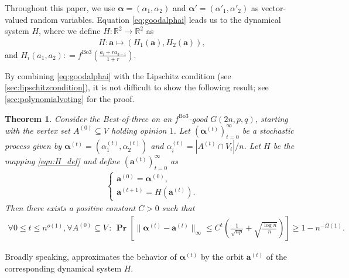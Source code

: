 \documentclass[letterpaper,11pt]{article}
\newtheorem{theorem}{Theorem}[section]
\newcommand{\Bthree}{\mathrm{Bo3}}
\renewcommand\Pr{\mathop{\mathbf{Pr}}}
\def\defeq{\mathrel{\mathop:}=}%
\begin{document}
Throughout this paper, we use ${\boldsymbol \alpha}=(\alpha_1,\alpha_2)$ and ${\boldsymbol \alpha}'=(\alpha'_1,\alpha'_2)$ as vector-valued random variables.
Equation \cref{eq:goodalphai} leads us to the dynamical system $H$, where we define $H:\mathbb{R}^2\to \mathbb{R}^2$ as
\begin{align}
H:\mathbf{a} \mapsto (H_1(\mathbf{a}),H_2(\mathbf{a})), \label{eqn:H_def}
\end{align}
and $H_i(a_1,a_2)\defeq f^{\Bthree}\left(\frac{a_i+ra_{3-i}}{1+r}\right)$.
%

By combining \cref{eq:goodalphai} with the Lipschitz condition (see \cref{sec:lipschitzcondition}), it is not difficult to show the following result; see \cref{sec:polynomialvoting} for the proof. 
\begin{theorem} \label{thm:approximation_vectorfield}
Consider the Best-of-three on an $f^{\Bthree}$-good $G(2n,p,q)$, starting with the vertex set $A^{(0)}\subseteq V$ holding opinion $1$.
Let $({\boldsymbol \alpha}^{(t)})_{t=0}^{\infty}$ be a stochastic process given by ${\boldsymbol \alpha}^{(t)}=(\alpha^{(t)}_1,\alpha^{(t)}_2)$ and $\alpha^{(t)}_i=|A^{(t)}\cap V_i|/n$.
Let $H$ be the mapping \cref{eqn:H_def} and define $(\mathbf{a}^{(t)})_{t=0}^\infty$ as %
\begin{align}
\label{eqn:veca_def}
\begin{cases}
\mathbf{a}^{(0)}={\boldsymbol \alpha}^{(0)},\\
\mathbf{a}^{(t+1)}=H(\mathbf{a}^{(t)}).
\end{cases}
\end{align}
Then there exists a positive constant $C>0$ such that
\begin{align*}
\forall 0\leq t\leq n^{o(1)},\forall A^{(0)}\subseteq V\,:\,\Pr\left[\|{\boldsymbol \alpha}^{(t)}-\mathbf{a}^{(t)}\|_\infty \leq C^t \left(\frac{1}{\sqrt{np}}+\sqrt{\frac{\log n}{n}}\right)\right] \geq 1-n^{-\Omega(1)}.
\end{align*}
\end{theorem}
Broadly speaking,  approximates the behavior of ${\boldsymbol \alpha}^{(t)}$ by the orbit $\mathbf{a}^{(t)}$ of the corresponding dynamical system $H$.
\end{document}
